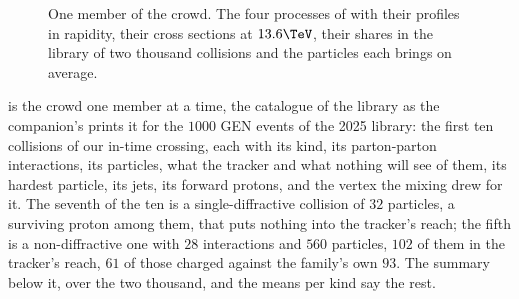 \begin{figure}[htbp]\centering
\resizebox{\textwidth}{!}{}
\caption[One member of the crowd: the four kinds of inelastic collision]{One
member of the crowd. The four processes of  with
their profiles in rapidity, their cross sections at $13.6\TeV$, their
shares in the library of two thousand collisions and the particles each
brings on average.}
\label{fig:crowd_on_the_road:minbias_sketch}
\end{figure}

 is the crowd one member at a
time, the catalogue of the library as the companion's
 prints it for the $1000$ GEN events of the 2025
\CMSSW library: the first ten collisions of our in-time crossing, each
with its kind, its parton-parton interactions, its particles, what the
tracker and what nothing will see of them, its hardest particle, its
jets, its forward protons, and the vertex the mixing drew for it. The
seventh of the ten is a single-diffractive collision of $32$ particles,
a surviving proton among them, that puts nothing into the tracker's
reach; the fifth is a non-diffractive one with $28$ interactions and
$560$ particles, $102$ of them in the tracker's reach, $61$ of those
charged against the family's own $93$. The summary below it, over the two
thousand, and the means per kind say the rest.

\begin{table}[htbp]\centering\small
\caption[The catalogue of the library: ten collisions, the summary and
the means per kind]{The catalogue of the library, written by
 in the format of the companion's
. Top: the first ten in-time collisions of our
crossing, with their library event, kind, parton-parton interactions
(the hardest scattering plus the multiparton ones), stable particles,
charged ones, central ones ($|\eta|<2.5$ and $\pt>0.5\GeV$, all species),
the ones beyond $|\eta|=5.5$ where no subdetector is, the hardest
particle, the scalar sum of \pt, the \antikt $R=0.4$ jets above
$10\GeV$, the forward protons that keep most of the beam energy
($\xi<0.55$, the ones \CMSSW's  carries to the PPS),
and the vertex the mixing drew. Middle: the same quantities over the two
thousand collisions of the library, with the vertices of the $960$
collisions of our event. Bottom: the means per kind, with the cross
section of each at $13.6\TeV$.}
\label{tab:crowd_on_the_road:catalogue}
\scriptsize\setlength{\tabcolsep}{3pt}
\resizebox{\textwidth}{!}{\minbiasCatalogueTen}\\[2mm]
\minbiasCatalogueSummary\\[2mm]
\resizebox{\textwidth}{!}{\minbiasCataloguePerProcess}
\end{table}

